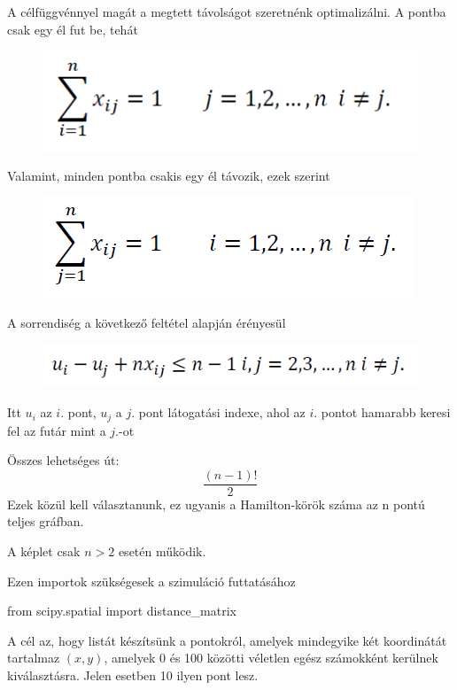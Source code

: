 A célfüggvénnyel magát a megtett távolságot szeretnénk optimalizálni. A pontba csak egy él fut be, tehát
\begin{figure}[h!]
\centering
\includegraphics[scale=0.5]{images/3tsp.png}
\end{figure}

Valamint, minden pontba csakis egy él távozik, ezek szerint
\begin{figure}[h!]
\centering
\includegraphics[scale=0.5]{images/4tsp.png}
\end{figure}

A sorrendiség a következő feltétel alapján érényesül
\begin{figure}[h!]
\centering
\includegraphics[scale=0.5]{images/5tsp.png}
\end{figure}

Itt $u_{i}$ az $i.$ pont, $u_{j}$ a $j.$ pont látogatási indexe, ahol az $i.$ pontot hamarabb keresi fel az futár mint a $j.$-ot


Összes lehetséges út:
\[
\dfrac{(n-1)!}{2}
\]
Ezek közül kell választanunk, ez ugyanis a Hamilton-körök száma az n pontú teljes gráfban.

A képlet csak $n > 2$ esetén működik.

Ezen importok szükségesek a szimuláció futtatásához

\begin{python}
from scipy.spatial import distance_matrix
\end{python}

A cél az, hogy listát készítsünk a pontokról, amelyek mindegyike két koordinátát tartalmaz $(x, y)$, amelyek 0 és 100 közötti véletlen egész számokként kerülnek kiválasztásra. Jelen esetben 10 ilyen pont lesz.

